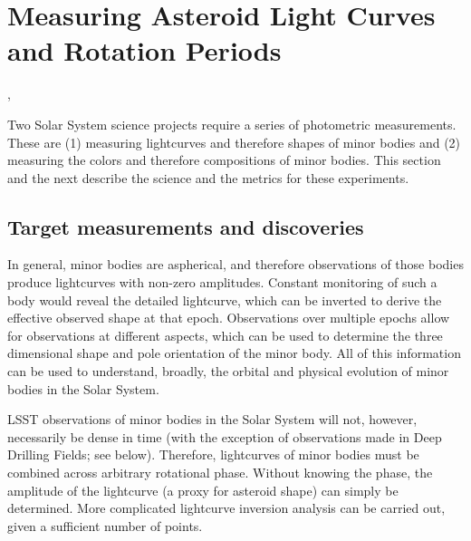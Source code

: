 %
%

\section{Measuring Asteroid Light Curves and Rotation Periods}
\def\secname{\chpname:lightcurves}\label{sec:\secname}

,

Two Solar System science projects require a series of photometric
measurements. These are (1) measuring lightcurves and therefore shapes
of minor bodies and (2) measuring the colors and therefore compositions
of minor bodies. This section and the next describe the science and the
metrics for these experiments.


\subsection{Target measurements and discoveries}
\label{sec:\secname:targets}

In general, minor bodies are aspherical, and therefore observations of
those bodies produce lightcurves with non-zero amplitudes. Constant
monitoring of such a body would reveal the detailed lightcurve, which
can be inverted to derive the effective observed shape at that epoch.
Observations over multiple epochs allow for observations at different
aspects, which can be used to determine the three dimensional shape and
pole orientation of the minor body. All of this information can be used
to understand, broadly, the orbital and physical evolution of minor
bodies in the Solar System.

LSST observations of minor bodies in the Solar System will not, however,
necessarily be dense in time (with the exception of observations made in
Deep Drilling Fields; see below). Therefore, lightcurves of minor bodies
must be combined across arbitrary rotational phase. Without knowing the
phase, the amplitude of the lightcurve (a proxy for asteroid shape) can
simply be determined. More complicated lightcurve inversion analysis
\citep[e.g.,][]{2016A&A...587A..48D}
can be carried out, given a sufficient number of points.


